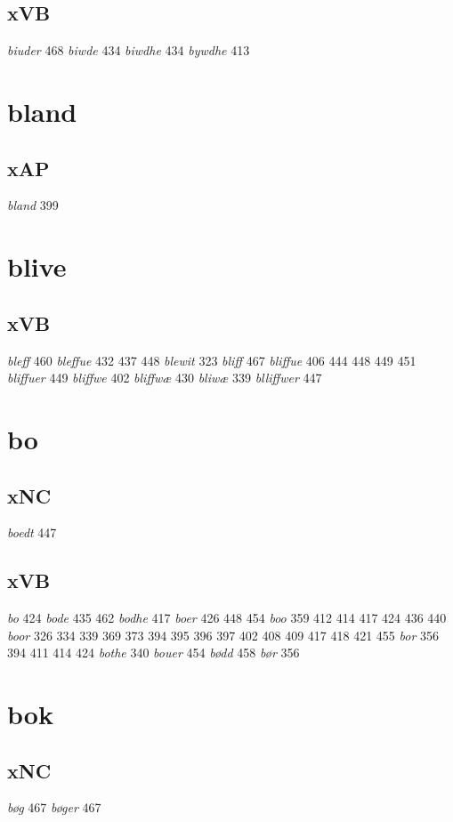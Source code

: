 \documentclass[a4paper,twocolumn]{article}
\begin{document}
\subsection{xVB}
\label{sec:orgb5d5562}
\emph{biuder} 468 \emph{biwde} 434 \emph{biwdhe} 434 \emph{bywdhe} 413 
\section{bland}
\label{sec:org7e75b7a}
\subsection{xAP}
\label{sec:orge9c4e73}
\emph{bland} 399 
\section{blive}
\label{sec:org9efef6a}
\subsection{xVB}
\label{sec:orgc202c3f}
\emph{bleff} 460 \emph{bleffue} 432 437 448 \emph{blewit} 323 \emph{bliff} 467 \emph{bliffue} 406 444 448 449 451 \emph{bliffuer} 449 \emph{bliffwe} 402 \emph{bliffwæ} 430 \emph{bliwæ} 339 \emph{blliffwer} 447 
\section{bo}
\label{sec:org307663b}
\subsection{xNC}
\label{sec:org48527f5}
\emph{boedt} 447 
\subsection{xVB}
\label{sec:org05d5cab}
\emph{bo} 424 \emph{bode} 435 462 \emph{bodhe} 417 \emph{boer} 426 448 454 \emph{boo} 359 412 414 417 424 436 440 \emph{boor} 326 334 339 369 373 394 395 396 397 402 408 409 417 418 421 455 \emph{bor} 356 394 411 414 424 \emph{bothe} 340 \emph{bouer} 454 \emph{bødd} 458 \emph{bør} 356 
\section{bok}
\label{sec:org70cff45}
\subsection{xNC}
\label{sec:org8cc9515}
\emph{bøg} 467 \emph{bøger} 467 
\end{document}
